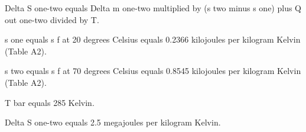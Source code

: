 Delta S one-two equals Delta m one-two multiplied by (s two minus s one) plus Q out one-two divided by T.  

s one equals s f at 20 degrees Celsius equals 0.2366 kilojoules per kilogram Kelvin (Table A2).  

s two equals s f at 70 degrees Celsius equals 0.8545 kilojoules per kilogram Kelvin (Table A2).  

T bar equals 285 Kelvin.  

Delta S one-two equals 2.5 megajoules per kilogram Kelvin.
